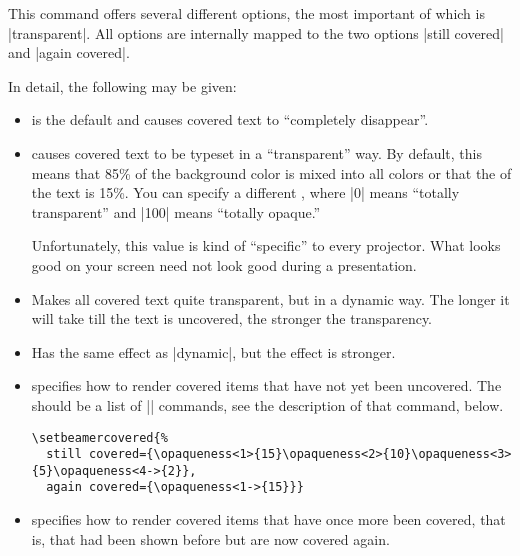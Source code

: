 \begin{command}{\setbeamercovered{}}
  This command offers several different options, the most important of which is |transparent|. All options are internally mapped to the two options |still covered| and |again covered|.

  In detail, the following  may be given:
  \begin{itemize}
  \item
     is the default and causes covered text to ``completely disappear''.
  \item
     causes covered text to be typeset in a ``transparent'' way. By default, this means that 85\% of the background color is mixed into all colors or that the  of the text is 15\%. You can specify a different , where |0| means ``totally transparent'' and |100| means ``totally opaque.''

    Unfortunately, this value is kind of ``specific'' to every projector. What looks good on your screen need not look good during a presentation.
  \item
     Makes all covered text quite transparent, but in a dynamic way. The longer it will take till the text is uncovered, the stronger the transparency.
  \item
     Has the same effect as |dynamic|, but the effect is stronger.
  \item
     specifies how to render covered items that have not yet been uncovered. The  should be a list of |\opaqueness| commands, see the description of that command, below.
    \example
\begin{Verbatim}
\setbeamercovered{%
  still covered={\opaqueness<1>{15}\opaqueness<2>{10}\opaqueness<3>{5}\opaqueness<4->{2}},
  again covered={\opaqueness<1->{15}}}
\end{Verbatim}

  \item
     specifies how to render covered items that have once more been covered, that is, that had been shown before but are now covered again.
  \end{itemize}
\end{command}


